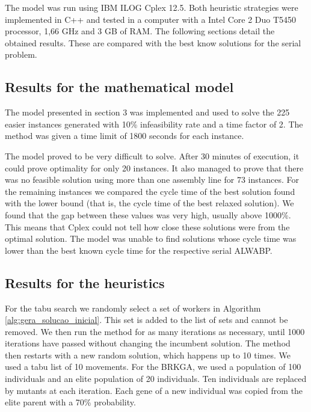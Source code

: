 \documentclass{singlecol-new}
\begin{document}
The model was run using IBM ILOG Cplex 12.5. Both heuristic strategies were implemented in C++ and tested in a computer with a Intel Core 2 Duo T5450 processor, 1,66 GHz and 3 GB of RAM. The following sections detail the obtained results. These are compared with the best know solutions for the serial problem.

\subsection{Results for the mathematical model}

The model presented in section 3 was implemented and used to solve the 225 easier instances generated with 10\% infeasibility rate and a time factor of 2. The method was given a time limit of 1800 seconds for each instance.

The model proved to be very difficult to solve. After 30 minutes of execution, it could prove optimality for only 20 instances. It also managed to prove that there was no feasible solution using more than one assembly line for 73 instances. For the remaining instances we compared the cycle time of the best solution found with the lower bound (that is, the cycle time of the best relaxed solution). We found that the gap between these values was very high, usually above 1000\%. This means that Cplex could not tell how close these solutions were from the optimal solution. The model was unable to find solutions whose cycle time was lower than the best known cycle time for the respective serial ALWABP.

\subsection{Results for the heuristics}

For the tabu search we randomly select a set of workers in Algorithm \ref{alg:gera_solucao_inicial}. This set is added to the list of sets and cannot be removed. We then run the method for as many iterations as necessary, until 1000 iterations have passed without changing the incumbent solution. The method then restarts with a new random solution, which happens up to 10 times. We used a tabu list of 10 movements. For the BRKGA, we used a population of 100 individuals and an elite population of 20 individuals. Ten individuals are replaced by mutants at each iteration. Each gene of a new individual was copied from the elite parent with a 70\% probability.
\end{document}
